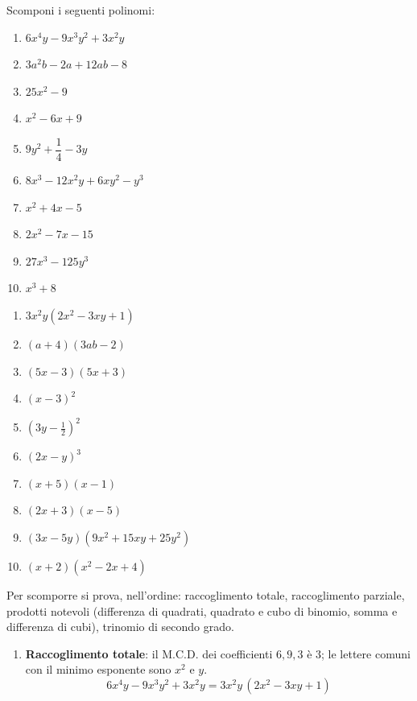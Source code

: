 \begin{question}[ID=1.1, subtitle={Scomposizione di polinomi — serie 1}, tags={scomposizione, prodotti notevoli}, difficulty=facile]
Scomponi i seguenti polinomi:
\begin{enumerate}
  \item $6x^4y - 9x^3y^2 + 3x^2y$
  \item $3a^2b - 2a + 12ab - 8$
  \item $25x^2 -9$
  \item $x^2 - 6x  + 9$
  \color{gray}\item $9y^2 +\dfrac{1}{4}-3y$
  \color{gray}\item $8x^3 - 12x^2y + 6xy^2 - y^3$
  \color{black}\item $x^2 +4x  - 5$
  \color{gray}\item $2x^2 - 7x - 15$
  \color{black}\item $27x^3 - 125y^3$
  \color{gray}\item $x^3 + 8$
\end{enumerate}
\begin{solution}
\begin{enumerate}
    \item $3x^2y(2x^2-3xy+1)$
    \item $(a+4)(3ab-2)$
    \item $(5x-3)(5x+3)$
    \item $(x-3)^2$
    \item $\left(3y-\tfrac12\right)^2$
    \item $(2x-y)^3$
    \item $(x+5)(x-1)$
    \item $(2x+3)(x-5)$
    \item $(3x-5y)(9x^2+15xy+25y^2)$
    \item $(x+2)(x^2-2x+4)$
\end{enumerate}
\end{solution}
\begin{explanation}
Per scomporre si prova, nell'ordine: raccoglimento totale, raccoglimento parziale, prodotti notevoli (differenza di quadrati, quadrato e cubo di binomio, somma e differenza di cubi), trinomio di secondo grado.
\begin{enumerate}
    \item \textbf{Raccoglimento totale}: il M.C.D. dei coefficienti $6,9,3$ è $3$; le lettere comuni con il minimo esponente sono $x^2$ e $y$.
    \[ 6x^4y-9x^3y^2+3x^2y=3x^2y\,(2x^2-3xy+1) \]

\end{enumerate}
\end{explanation}
\end{question}
